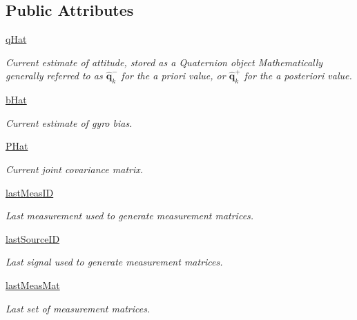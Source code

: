 \subsection*{Public Attributes}
\begin{DoxyCompactItemize}
\item 
\hyperlink{classAttitudeSubstate_1_1AttitudeState6DOF_a36a58a47280151dd544762d9a1d5c35d}{q\+Hat}
\begin{DoxyCompactList}\small\item\em Current estimate of attitude, stored as a Quaternion object Mathematically generally referred to as $\mathbf{\hat{q}}^{-}_{k}$ for the a priori value, or $\mathbf{\hat{q}}^{+}_{k}$ for the a posteriori value. \end{DoxyCompactList}\item 
\hyperlink{classAttitudeSubstate_1_1AttitudeState6DOF_a1b8eff7c89a7a03875dc04263da7ec18}{b\+Hat}
\begin{DoxyCompactList}\small\item\em Current estimate of gyro bias. \end{DoxyCompactList}\item 
\hyperlink{classAttitudeSubstate_1_1AttitudeState6DOF_a6aac27efa4d5962865f7d3f701c919ab}{P\+Hat}
\begin{DoxyCompactList}\small\item\em Current joint covariance matrix. \end{DoxyCompactList}\item 
\hyperlink{classAttitudeSubstate_1_1AttitudeState6DOF_a1ea482e5536162f74876d1dd23b12e96}{last\+Meas\+ID}
\begin{DoxyCompactList}\small\item\em Last measurement used to generate measurement matrices. \end{DoxyCompactList}\item 
\hyperlink{classAttitudeSubstate_1_1AttitudeState6DOF_a0161cc024a651de854100014872165af}{last\+Source\+ID}
\begin{DoxyCompactList}\small\item\em Last signal used to generate measurement matrices. \end{DoxyCompactList}\item 
\hyperlink{classAttitudeSubstate_1_1AttitudeState6DOF_ae23a47fae330703aa8a50b207275c9b0}{last\+Meas\+Mat}
\begin{DoxyCompactList}\small\item\em Last set of measurement matrices. \end{DoxyCompactList}\item 

\end{DoxyCompactItemize}
